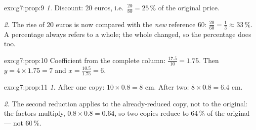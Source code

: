 \begin{solution}{exo:g7:prop:9}
\emph{1.} Discount: $20$ euros, i.e.\ $\frac{20}{80} = 25\,\%$ of the
original price.

\emph{2.} The rise of $20$ euros is now compared with the \emph{new}
reference $60$: $\frac{20}{60} = \frac13 \approx 33\,\%$. A percentage
always refers to a whole; the whole changed, so the percentage does
too.
\end{solution}

\begin{solution}{exo:g7:prop:10}
Coefficient from the complete column: $\frac{17.5}{10} = 1.75$. Then
$y = 4 \times 1.75 = 7$ and $x = \frac{10.5}{1.75} = 6$.
\end{solution}

\begin{solution}{exo:g7:prop:11}
\emph{1.} After one copy: $10 \times 0.8 = 8$ cm. After two:
$8 \times 0.8 = 6.4$ cm.

\emph{2.} The second reduction applies to the already-reduced copy,
not to the original: the factors multiply,
$0.8 \times 0.8 = 0.64$, so two copies reduce to $64\,\%$ of the
original --- not $60\,\%$.
\end{solution}

